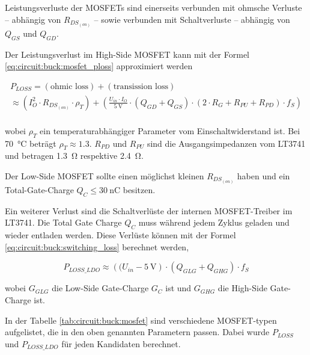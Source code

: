 Leistungsverluste der MOSFETs sind einerseits verbunden mit ohmsche  Verluste --
abh\"angig  von  $R_{DS_{(on)}}$  --  sowie   verbunden  mit  Schaltverluste  --
abh\"angig von $Q_{GS}$ und $Q_{GD}$.

Der    Leistungsverlust    im    High-Side   MOSFET   kann   mit   der    Formel
\ref{eq:circuit:buck:mosfet_ploss} approximiert werden

\begin{multline}
    P_{LOSS} = (\textrm{ohmic loss}) + (\textrm{transission loss}) \\
             \approx \left( I_O^2 \cdot R_{DS_{(on)}} \cdot \rho_T \right)
                    + \left( \frac{U_{in} \cdot I_O}{\SI{5}{\volt}} \cdot \left(Q_{GD} + Q_{GS} \right) \cdot \left( 2 \cdot R_G + R_{PU} + R_{PD} \right) \cdot f_S \right) \\
    \label{eq:circuit:buck:mosfet_ploss}
\end{multline}

wobei $\rho_T$ ein temperaturabh\"angiger Parameter vom Einschaltwiderstand ist.
Bei \SI{70}{\celsius} betr\"agt $\rho_T \approx 1.3$. $R_{PD}$ und $R_{PU}$ sind
die  Ausgangsimpedanzen  vom  LT3741  und  betragen  \SI{1.3}{\ohm}   respektive
\SI{2.4}{\ohm}.

Der  Low-Side MOSFET sollte einen m\"oglichst kleinen $R_{DS_{(on)}}$ haben  und
ein    Total-Gate-Charge    $Q_C    \leq    \SI{30}{\nano\coulomb}$    besitzen.

Ein  weiterer Verlust sind die Schaltverl\"uste der internen  MOSFET-Treiber  im
LT3741. Die Total Gate Charge $Q_C$ muss  w\"ahrend  jedem  Zyklus  geladen  und
wieder   entladen   werden.   Diese   Verl\"uste   k\"onnen   mit   der   Formel
\ref{eq:circuit:buck:switching_loss} berechnet werden,

\begin{equation}
    P_{LOSS\_LDO} \approx \left( (U_{in} - \SI{5}{\volt} \right) \cdot \left( Q_{GLG} + Q_{GHG} \right) \cdot f_S
    \label{eq:circuit:buck:switching_loss}
\end{equation}

wobei $G_{GLG}$ die  Low-Side  Gate-Charge $G_C$ ist und $G_{GHG}$ die High-Side
Gate-Charge ist.

In  der  Tabelle  \ref{tab:circuit:buck:mosfet}  sind  verschiedene MOSFET-typen
aufgelistet, die in den oben genannten Parametern passen. Dabei wurde $P_{LOSS}$
und $P_{LOSS\_LDO}$ f\"ur jeden Kandidaten berechnet.

